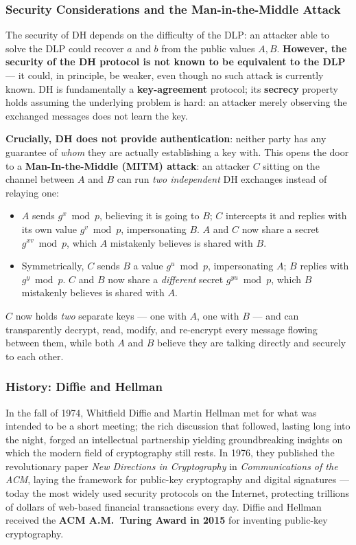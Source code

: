 \documentclass[12pt, a4paper]{article}
\begin{document}
\subsubsection{Security Considerations and the Man-in-the-Middle Attack}
The security of DH depends on the difficulty of the DLP: an attacker able to solve the DLP could recover $a$ and $b$ from the public values $A,B$. \textcolor{blue!50!black}{\textbf{However, the security of the DH protocol is not known to be equivalent to the DLP}} --- it could, in principle, be weaker, even though no such attack is currently known. DH is fundamentally a \textbf{key-agreement} protocol; its \textbf{secrecy} property holds assuming the underlying problem is hard: an attacker merely observing the exchanged messages does not learn the key.

\textcolor{red!70!black}{\textbf{Crucially, DH does not provide authentication}}: neither party has any guarantee of \emph{whom} they are actually establishing a key with. This opens the door to a \textbf{Man-In-the-Middle (MITM) attack}: an attacker $C$ sitting on the channel between $A$ and $B$ can run \emph{two independent} DH exchanges instead of relaying one:
\begin{itemize}
    \item $A$ sends $g^x \bmod p$, believing it is going to $B$; $C$ intercepts it and replies with its own value $g^v \bmod p$, impersonating $B$. $A$ and $C$ now share a secret $g^{xv} \bmod p$, which $A$ mistakenly believes is shared with $B$.
    \item Symmetrically, $C$ sends $B$ a value $g^u \bmod p$, impersonating $A$; $B$ replies with $g^y \bmod p$. $C$ and $B$ now share a \emph{different} secret $g^{yu} \bmod p$, which $B$ mistakenly believes is shared with $A$.
\end{itemize}
$C$ now holds \emph{two} separate keys --- one with $A$, one with $B$ --- and can transparently decrypt, read, modify, and re-encrypt every message flowing between them, while both $A$ and $B$ believe they are talking directly and securely to each other.

\subsubsection{History: Diffie and Hellman}
In the fall of 1974, Whitfield Diffie and Martin Hellman met for what was intended to be a short meeting; the rich discussion that followed, lasting long into the night, forged an intellectual partnership yielding groundbreaking insights on which the modern field of cryptography still rests. In 1976, they published the revolutionary paper \emph{New Directions in Cryptography} in \emph{Communications of the ACM}, laying the framework for public-key cryptography and digital signatures --- today the most widely used security protocols on the Internet, protecting trillions of dollars of web-based financial transactions every day. Diffie and Hellman received the \textbf{ACM A.M.\ Turing Award in 2015} for inventing public-key cryptography.
\end{document}
